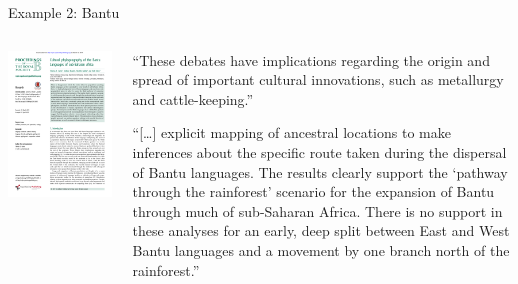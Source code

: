 \documentclass[9pt]{beamer}
\begin{document}
\begin{frame}{Example 2: Bantu}
  \begin{columns}
    \begin{column}{0.5\textwidth}
      \footnotemark\includegraphics[width=\textwidth,page=5,trim={5cm 11.5cm 3cm 1cm},clip]{bantu.pdf}
    \end{column}
    \begin{column}{0.5\textwidth}
      \footnotesize “These debates have implications regarding the
      origin and spread of important cultural innovations, such as
      metallurgy and cattle-keeping.”

      “[…] explicit mapping of ancestral locations to make
      inferences about the specific route taken during the dispersal
      of Bantu languages. The results clearly support the ‘pathway
      through the rainforest’ scenario for the expansion of Bantu
      through much of sub-Saharan Africa. There is no support
      in these analyses for an early, deep split between East and
      West Bantu languages and a movement by one branch
      north of the rainforest.”
    \end{column}
  \end{columns}
\end{frame}
\end{document}
